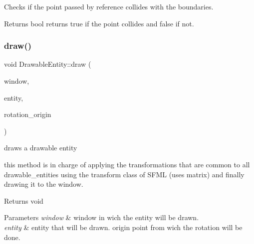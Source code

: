 Checks if the point passed by reference collides with the boundaries.

\begin{DoxyReturn}{Returns}
bool returns true if the point collides and false if not. 
\end{DoxyReturn}
\mbox{\label{class_drawable_entity_a31ea3607cab83dc56103de086764369e}} 
\subsubsection{\texorpdfstring{draw()}{draw()}}
{\footnotesize\ttfamily void Drawable\+Entity\+::draw (\begin{DoxyParamCaption}\item[{sf\+::\+Render\+Window \&}]{window,  }\item[{const sf\+::\+Drawable \&}]{entity,  }\item[{const sf\+::\+Vector2f \&}]{rotation\+\_\+origin }\end{DoxyParamCaption})}



draws a drawable entity 

this method is in charge of applying the transformations that are common to all drawable\+\_\+entities using the transform class of S\+F\+ML (uses matrix) and finally drawing it to the window.

\begin{DoxyReturn}{Returns}
void 
\end{DoxyReturn}

\begin{DoxyParams}{Parameters}
{\em window} & window in wich the entity will be drawn. \\
\hline
{\em entity} & entity that will be drawn.  origin point from wich the rotation will be done. \\
\hline
\end{DoxyParams}
\mbox{\label{class_drawable_entity_a3893879bf0710a7f5c5e7eb758ad7e96}} 
